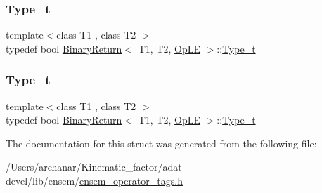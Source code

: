 \mbox{\label{structBinaryReturn_3_01T1_00_01T2_00_01OpLE_01_4_a97477e4d06d79977296f86c374a5bc1e}} 
\subsubsection{\texorpdfstring{Type\_t}{Type\_t}\hspace{0.1cm}{\footnotesize\ttfamily [2/3]}}
{\footnotesize\ttfamily template$<$class T1 , class T2 $>$ \\
typedef bool \mbox{\hyperlink{structBinaryReturn}{Binary\+Return}}$<$ T1, T2, \mbox{\hyperlink{structOpLE}{Op\+LE}} $>$\+::\mbox{\hyperlink{structBinaryReturn_3_01T1_00_01T2_00_01OpLE_01_4_a97477e4d06d79977296f86c374a5bc1e}{Type\+\_\+t}}}

\mbox{\label{structBinaryReturn_3_01T1_00_01T2_00_01OpLE_01_4_a97477e4d06d79977296f86c374a5bc1e}} 
\subsubsection{\texorpdfstring{Type\_t}{Type\_t}\hspace{0.1cm}{\footnotesize\ttfamily [3/3]}}
{\footnotesize\ttfamily template$<$class T1 , class T2 $>$ \\
typedef bool \mbox{\hyperlink{structBinaryReturn}{Binary\+Return}}$<$ T1, T2, \mbox{\hyperlink{structOpLE}{Op\+LE}} $>$\+::\mbox{\hyperlink{structBinaryReturn_3_01T1_00_01T2_00_01OpLE_01_4_a97477e4d06d79977296f86c374a5bc1e}{Type\+\_\+t}}}



The documentation for this struct was generated from the following file\+:\begin{DoxyCompactItemize}
\item 
/\+Users/archanar/\+Kinematic\+\_\+factor/adat-\/devel/lib/ensem/\mbox{\hyperlink{adat-devel_2lib_2ensem_2ensem__operator__tags_8h}{ensem\+\_\+operator\+\_\+tags.\+h}}\end{DoxyCompactItemize}
